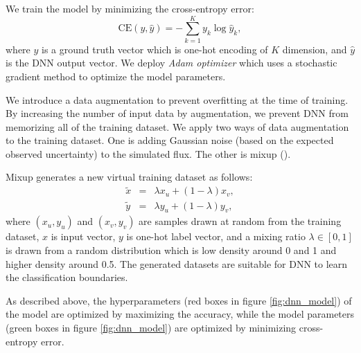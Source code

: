 \documentclass[proof]{pasj01}
\begin{document}
We train the model by minimizing the cross-entropy error: 
\begin{equation}
\mathrm{CE} \left(y, \hat{y} \right) =　-\sum_{k = 1}^K y_k \log \hat{y}_k,
\end{equation}
where $y$ is a ground truth vector which is one-hot encoding of $K$ dimension, and $\hat{y}$ is the DNN output vector.
We deploy {\it Adam optimizer} which uses a stochastic gradient method to optimize the model parameters.

We introduce a data augmentation to prevent overfitting at the time of training.
By increasing the number of input data by augmentation, we prevent DNN from memorizing all of the training dataset.
We apply two ways of data augmentation to the training dataset.
One is adding Gaussian noise (based on the expected observed uncertainty) to the simulated flux.
The other is mixup (\cite{mixup}).

Mixup generates a new virtual training dataset as follows:
\begin{eqnarray*}
    \tilde{x} &=& \lambda x_u + \left( 1-\lambda \right) x_v, \\
    \tilde{y} &=& \lambda y_u + \left( 1-\lambda \right) y_v,
\end{eqnarray*}
where $\left(x_u, y_u\right)$ and $\left(x_v, y_v\right)$ are samples drawn at random from the training dataset, $x$ is input vector, $y$ is one-hot label vector, 
and a mixing ratio $\lambda \in \left[0, 1\right]$ is drawn from a random distribution which is low density around 0 and 1 and higher density around 0.5. 
The generated datasets are suitable for DNN to learn the classification boundaries.

As described above, the hyperparameters (red boxes in figure \ref{fig:dnn_model}) of the model are optimized by maximizing the accuracy, while 
the model parameters (green boxes in figure \ref{fig:dnn_model}) are optimized by minimizing cross-entropy error.
%
%
\end{document}
